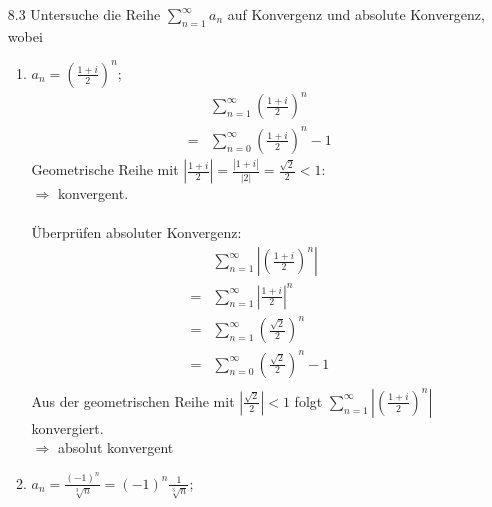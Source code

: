 \documentclass{HM}
\begin{document}
\begin{enumerate}
\item[8.3] Untersuche die Reihe $\sum\limits_{n=1}^\infty a_n$ auf Konvergenz und absolute Konvergenz, wobei\\
\begin{enumerate}

\item $a_n=\left(\frac{1+i}{2}\right)^n$;
\begin{align*}
 	&\sum\limits_{n=1}^\infty\left(\frac{1+i}{2}\right)^n\\
	=&\sum\limits_{n=0}^\infty\left(\frac{1+i}{2}\right)^n-1
\end{align*}
Geometrische Reihe mit $|\frac{1+i}{2}| = \frac{|1+i|}{|2|} = \frac{\sqrt{2}}{2} < 1$:\\
$\Rightarrow$ konvergent.\\\\
Überprüfen absoluter Konvergenz:\\
\begin{align*}
	&\sum\limits_{n=1}^\infty\left|\left(\frac{1+i}{2}\right)^n\right|\\
	=&\sum\limits_{n=1}^\infty\left|\frac{1+i}{2}\right|^n\\
	=&\sum\limits_{n=1}^\infty\left(\frac{\sqrt{2}}{2}\right)^n\\
	=&\sum\limits_{n=0}^\infty\left(\frac{\sqrt{2}}{2}\right)^n-1\\
\end{align*}
Aus der geometrischen Reihe mit $|\frac{\sqrt{2}}{2}| < 1$ folgt $\sum\limits_{n=1}^\infty\left|\left(\frac{1+i}{2}\right)^n\right|$ konvergiert.\\
$\Rightarrow$ absolut konvergent\\

\item $a_n=\frac{(-1)^n}{\sqrt[3]{n}}=(-1)^n\frac{1}{\sqrt[3]{n}}$;\\


\end{enumerate}
\end{enumerate}
\end{document}
